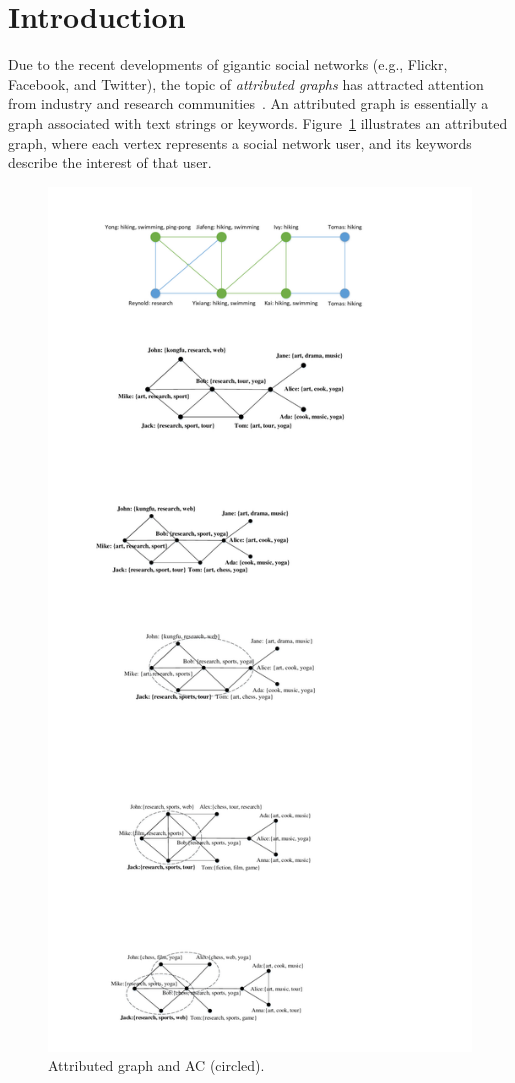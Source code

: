 \section{Introduction}
\label{intro}

Due to the recent developments of gigantic social networks (e.g., Flickr, Facebook, and Twitter), the topic of {\it attributed graphs} has attracted attention from industry and research communities~\cite{attr-topic-sigmod2012,keyword-icde2007,keyword-sigmod2007,keyword-vldb2005,keyword-yu-2009,keyword-vldb2011,fang2014}.  An attributed graph is essentially a graph associated with text strings or keywords.  Figure~\ref{fig:motivation} illustrates an attributed graph, where each vertex represents a social network user, and its keywords describe the interest of that user.

\begin{figure}
	\small
	\centering
	\includegraphics[width=0.88\linewidth]{figures/motivation}
	\caption{Attributed graph and AC (circled).}
	\label{fig:motivation}
\end{figure}

